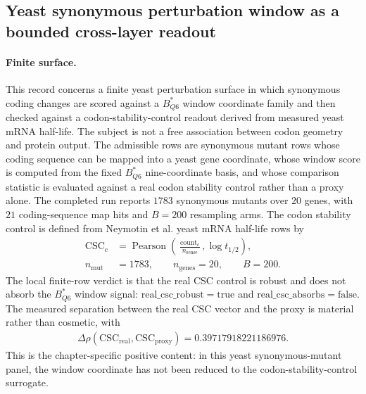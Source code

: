 \subsection{Yeast synonymous perturbation window as a bounded cross-layer readout}
\label{sec:bioreality-yeast-synonymous-perturbation-window}

\paragraph{Finite surface.}
This record concerns a finite yeast perturbation surface in which synonymous coding changes are scored against a $B^{*}_{Q6}$ window coordinate family and then checked against a codon-stability-control readout derived from measured yeast mRNA half-life.  The subject is not a free association between codon geometry and protein output.  The admissible rows are synonymous mutant rows whose coding sequence can be mapped into a yeast gene coordinate, whose window score is computed from the fixed $B^{*}_{Q6}$ nine-coordinate basis, and whose comparison statistic is evaluated against a real codon stability control rather than a proxy alone.  The completed run reports $1783$ synonymous mutants over $20$ genes, with $21$ coding-sequence map hits and $B=200$ resampling arms.  The codon stability control is defined from Neymotin et al. yeast mRNA half-life rows by
$$
\begin{aligned}
  \mathrm{CSC}_{c} &= \operatorname{Pearson}\!\left(\frac{\operatorname{count}_{c}}{n_{\mathrm{sense}}},\log t_{1/2}\right),\\
  n_{\mathrm{mut}} &= 1783,\qquad n_{\mathrm{genes}}=20,\qquad B=200.
\end{aligned}
$$
The local finite-row verdict is that the real CSC control is robust and does not absorb the $B^{*}_{Q6}$ window signal: $\mathrm{real\_csc\_robust}=\mathrm{true}$ and $\mathrm{real\_csc\_absorbs}=\mathrm{false}$.  The measured separation between the real CSC vector and the proxy is material rather than cosmetic, with
$$
\begin{aligned}
  \Delta\rho(\mathrm{CSC}_{\mathrm{real}},\mathrm{CSC}_{\mathrm{proxy}}) = 0.39717918221186976.
\end{aligned}
$$
This is the chapter-specific positive content: in this yeast synonymous-mutant panel, the window coordinate has not been reduced to the codon-stability-control surrogate.

